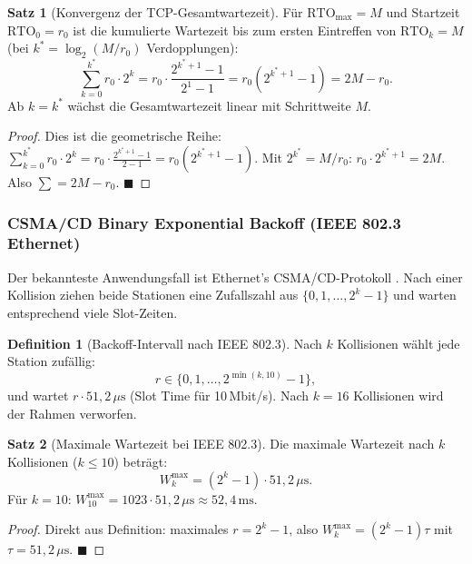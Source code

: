 ﻿\documentclass[a4paper,12pt]{article}
\theoremstyle{definition}
\newtheorem{definition}{Definition}
\newtheorem{satz}{Satz}
\begin{document}
\begin{satz}[Konvergenz der TCP-Gesamtwartezeit]
\label{satz:tcp_konvergenz}
Für $\mathrm{RTO}_{\max} = M$ und Startzeit $\mathrm{RTO}_0 = r_0$
ist die kumulierte Wartezeit bis zum ersten Eintreffen von
$\mathrm{RTO}_k = M$ (bei $k^* = \log_2(M/r_0)$ Verdopplungen):
\[
  \sum_{k=0}^{k^*} r_0 \cdot 2^k
  = r_0 \cdot \frac{2^{k^*+1}-1}{2^1 - 1}
  = r_0(2^{k^*+1}-1)
  = 2M - r_0.
\]
Ab $k = k^*$ wächst die Gesamtwartezeit linear mit Schrittweite $M$.
\end{satz}

\begin{proof}
Dies ist die geometrische Reihe:
$\sum_{k=0}^{k^*} r_0 \cdot 2^k = r_0 \cdot \frac{2^{k^*+1}-1}{2-1}
= r_0(2^{k^*+1}-1)$.
Mit $2^{k^*} = M/r_0$: $r_0 \cdot 2^{k^*+1} = 2M$.
Also $\sum = 2M - r_0$.
\hfill$\blacksquare$
\end{proof}

\subsubsection{CSMA/CD Binary Exponential Backoff (IEEE 802.3 Ethernet)}

Der bekannteste Anwendungsfall ist Ethernet's CSMA/CD-Protokoll
\cite{metcalfe1976ethernet}. Nach einer Kollision ziehen beide
Stationen eine Zufallszahl aus $\{0, 1, \ldots, 2^k-1\}$ und warten
entsprechend viele Slot-Zeiten.

\begin{definition}[Backoff-Intervall nach IEEE 802.3]
Nach $k$ Kollisionen wählt jede Station zufällig:
\[
  r \in \{0, 1, \ldots, 2^{\min(k,10)}-1\},
\]
und wartet $r \cdot 51{,}2\,\mu\mathrm{s}$ (Slot Time für 10\,Mbit/s).
Nach $k = 16$ Kollisionen wird der Rahmen verworfen.
\end{definition}

\begin{satz}[Maximale Wartezeit bei IEEE 802.3]
\label{satz:max_ethernet}
Die maximale Wartezeit nach $k$ Kollisionen ($k \leq 10$) beträgt:
\[
  W_k^{\max} = (2^k - 1) \cdot 51{,}2\,\mu\mathrm{s}.
\]
Für $k = 10$: $W_{10}^{\max} = 1023 \cdot 51{,}2\,\mu\mathrm{s}
\approx 52{,}4\,\mathrm{ms}$.
\end{satz}

\begin{proof}
Direkt aus Definition: maximales $r = 2^k - 1$,
also $W_k^{\max} = (2^k-1)\tau$ mit $\tau = 51{,}2\,\mu\mathrm{s}$.
\hfill$\blacksquare$
\end{proof}
\end{document}
